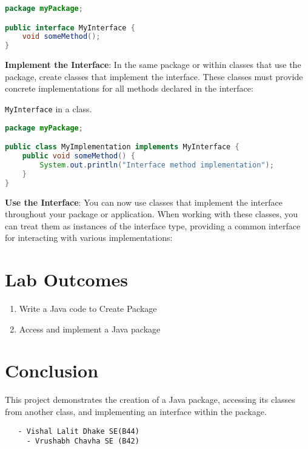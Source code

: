 \documentclass{article}
\begin{document}
\begin{lstlisting}[language=Java, backgroundcolor=\color{gray!10}]
package myPackage;

public interface MyInterface {
    void someMethod();
}
\end{lstlisting}

\textbf{Implement the Interface}: In the same package or within classes that use the package, create classes that implement the interface. These classes must provide concrete implementations for all methods declared in the interface:

\texttt{MyInterface} in a class.

\begin{lstlisting}[language=Java, backgroundcolor=\color{gray!10}]
package myPackage;

public class MyImplementation implements MyInterface {
    public void someMethod() {
        System.out.println("Interface method implementation");
    }
}
\end{lstlisting}



\textbf{Use the Interface}: You can now use classes that implement the interface throughout your package or application. When working with these classes, you can treat them as instances of the interface type, providing a common interface for interacting with various implementations:


\section*{Lab Outcomes}

\begin{enumerate}
\item Write a Java code to Create Package
\item Access and implement a Java package
\end{enumerate}


\section*{Conclusion}
This project demonstrates the creation of a Java package, accessing its classes from another class, and implementing an interface within the package.


\begin{lstlisting}
   - Vishal Lalit Dhake SE(B44)
     - Vrushabh Chavha SE (B42)
\end{lstlisting}
  
\end{document}
